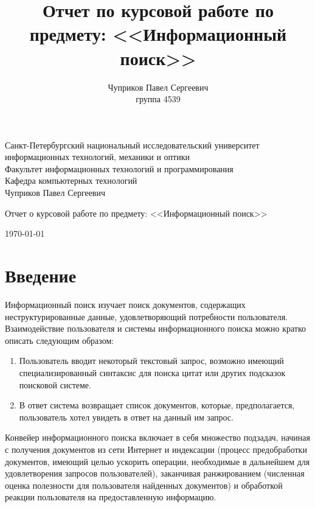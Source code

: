 \documentclass[12pt]{article}
\author{Чуприков Павел Сергеевич \\ группа 4539}
\title{Отчет по курсовой работе по предмету: <<Информационный поиск>>}
\begin{document}
\begin{titlepage}
\thispagestyle{empty}
\begin{center}
Санкт-Петербургский национальный исследовательский университет 
информационных технологий, механики и оптики\\
\smallskip
Факультет информационных технологий и программирования\\
\smallskip
Кафедра компьютерных технологий\\
\vspace{2cm}
\large{Чуприков Павел Сергеевич}\\
\vspace{1cm}
\begin{LARGE}
Отчет о курсовой работе по предмету: <<Информационный поиск>>\\
\end{LARGE}
\vfill
\today
\end{center}
\end{titlepage}

\setcounter{page}{2}
\tableofcontents
\pagebreak
\section{Введение}
Информационный поиск изучает поиск документов, содержащих неструктурированные данные,
удовлетворяющий потребности пользователя. Взаимодействие пользователя и системы информационного 
поиска можно кратко описать следующим образом:
\begin{enumerate}
\item Пользователь вводит некоторый текстовый запрос, возможно имеющий 
специализированный синтаксис для поиска цитат или других подсказок поисковой системе.
\item В ответ система возвращает список документов, которые, предполагается, 
пользователь хотел увидеть в ответ на данный им запрос.
\end{enumerate}

Конвейер информационного поиска включает в себя множество подзадач, начиная
с получения документов из сети Интернет и индексации (процесс предобработки
документов, имеющий целью ускорить операции, необходимые в дальнейшем
для удовлетворения запросов пользователей), заканчивая ранжированием
(численная оценка полезности для пользователя найденных документов) и
обработкой реакции пользователя на предоставленную информацию.
\end{document}
